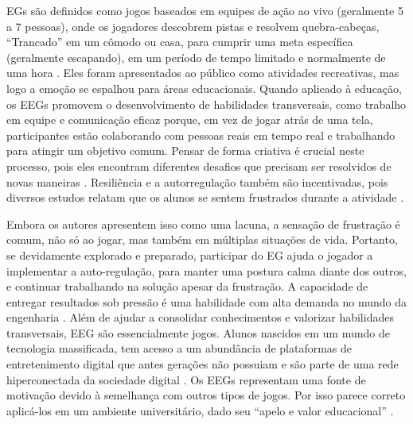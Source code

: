 EGs são definidos como jogos baseados em equipes de ação ao vivo (geralmente 5 a 7 pessoas), onde os jogadores descobrem pistas e resolvem quebra-cabeças, “Trancado” em um cômodo ou casa, para cumprir uma meta específica (geralmente escapando), em um período de tempo limitado e normalmente de uma hora \citep{nicholson_peeking_2015}. Eles foram apresentados ao público como atividades recreativas, mas logo a emoção se espalhou para áreas educacionais. Quando aplicado à educação, os EEGs promovem o desenvolvimento de habilidades transversais, como trabalho em equipe e comunicação eficaz porque, em vez de jogar atrás de uma tela, participantes estão colaborando com pessoas reais \citep{nicholson_creating_2018} em tempo real e trabalhando para atingir um objetivo comum. Pensar de forma criativa é crucial neste processo, pois eles encontram diferentes desafios que precisam ser resolvidos de novas maneiras \citep{wiemker_escape_2015}. Resiliência e a autorregulação também são incentivadas, pois diversos estudos relatam que os alunos se sentem frustrados durante a atividade \citep{hermanns_using_2017}.

Embora os autores apresentem isso como uma lacuna, a sensação de frustração é comum, não só ao jogar, mas também em múltiplas situações de vida. Portanto, se devidamente explorado e preparado, participar do EG ajuda o jogador a implementar a auto-regulação, para manter uma postura calma diante dos outros, e continuar trabalhando na solução apesar da frustração. A capacidade de entregar resultados sob pressão é uma habilidade com alta demanda no mundo da engenharia \citep{harun_employability_2017}. Além de ajudar a consolidar conhecimentos e valorizar habilidades transversais, EEG são essencialmente jogos. Alunos nascidos em um mundo de tecnologia massificada, tem acesso a um abundância de plataformas de entretenimento digital que antes gerações não possuiam \citep{osmanovic_beyond_2016} e são parte de uma rede hiperconectada da sociedade digital \citep{buitrago-ropero_digital_2020}. Os EEGs representam uma fonte de motivação devido à semelhança com outros tipos de jogos. Por isso parece correto aplicá-los em um ambiente universitário, dado seu “apelo e valor educacional” \citep{clarke_escaped_2017}.


